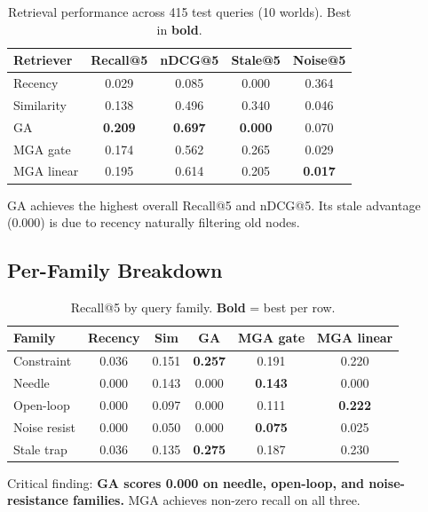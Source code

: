 \documentclass{article}
\begin{document}
\begin{table}[h]
\centering
\caption{Retrieval performance across 415 test queries (10 worlds). Best in \textbf{bold}.}
\vspace{0.5em}
\begin{tabular}{lcccc}
\toprule
\textbf{Retriever} & \textbf{Recall@5} & \textbf{nDCG@5} & \textbf{Stale@5} & \textbf{Noise@5} \\
\midrule
Recency & 0.029 & 0.085 & 0.000 & 0.364 \\
Similarity & 0.138 & 0.496 & 0.340 & 0.046 \\
GA & \textbf{0.209} & \textbf{0.697} & \textbf{0.000} & 0.070 \\
MGA gate & 0.174 & 0.562 & 0.265 & 0.029 \\
MGA linear & 0.195 & 0.614 & 0.205 & \textbf{0.017} \\
\bottomrule
\end{tabular}
\end{table}

GA achieves the highest overall Recall@5 and nDCG@5. Its stale advantage (0.000) is due to recency naturally filtering old nodes.

\subsection{Per-Family Breakdown}

\begin{table}[h]
\centering
\caption{Recall@5 by query family. \textbf{Bold} = best per row.}
\vspace{0.5em}
\begin{tabular}{lccccc}
\toprule
\textbf{Family} & \textbf{Recency} & \textbf{Sim} & \textbf{GA} & \textbf{MGA gate} & \textbf{MGA linear} \\
\midrule
Constraint & 0.036 & 0.151 & \textbf{0.257} & 0.191 & 0.220 \\
Needle & 0.000 & 0.143 & 0.000 & \textbf{0.143} & 0.000 \\
Open-loop & 0.000 & 0.097 & 0.000 & 0.111 & \textbf{0.222} \\
Noise resist & 0.000 & 0.050 & 0.000 & \textbf{0.075} & 0.025 \\
Stale trap & 0.036 & 0.135 & \textbf{0.275} & 0.187 & 0.230 \\
\bottomrule
\end{tabular}
\end{table}

Critical finding: \textbf{GA scores 0.000 on needle, open-loop, and noise-resistance families.} MGA achieves non-zero recall on all three.
\end{document}

